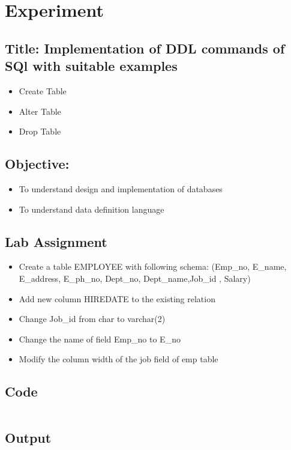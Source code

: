 \documentclass{article}
\begin{document}
\section*{Experiment \jobname}
\subsection*{\textbf{Title:} Implementation of DDL commands of SQl with suitable examples}
\begin{itemize}
	\item Create Table
	\item Alter Table
	\item Drop Table
\end{itemize}
\subsection*{\textbf{Objective:}}
\begin{itemize}
	\item To understand design and implementation of databases
	\item To understand data definition language
\end{itemize}
\subsection*{Lab Assignment}
\begin{itemize}
	\item Create a table EMPLOYEE with following schema: (Emp_no, E_name, E_address, E_ph_no, Dept_no, Dept_name,Job_id , Salary)
	\item Add new column HIREDATE to the existing relation
	\item Change Job_id from char to varchar(2)
	\item Change the name of field Emp_no to E_no
	\item Modify the column width of the job field of emp table
\end{itemize}
\subsection*{Code}
\inputminted{sql}{code/\obname.sql}
\subsection*{Output}

\end{document}
